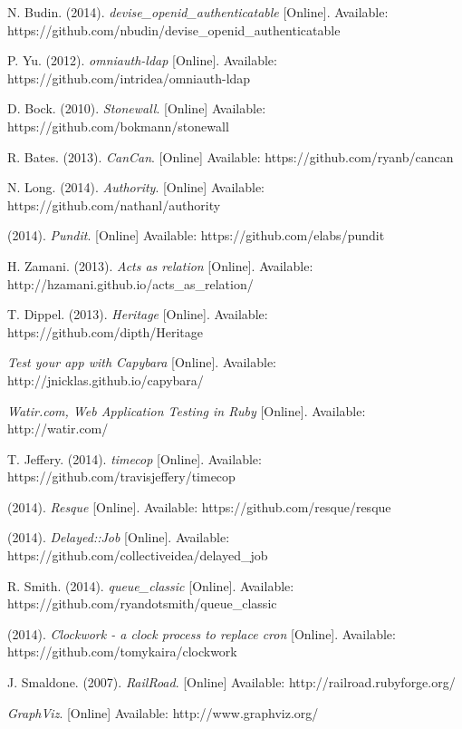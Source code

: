 \begin{thebibliography}{99}
N. Budin. (2014). \textit{devise\_openid\_authenticatable} [Online]. Available: https://github.com/nbudin/devise\_openid\_authenticatable

P. Yu. (2012). \textit{omniauth-ldap} [Online]. Available: https://github.com/intridea/omniauth-ldap

D. Bock. (2010). \textit{Stonewall}. [Online] Available: https://github.com/bokmann/stonewall

R. Bates. (2013). \textit{CanCan}. [Online] Available: https://github.com/ryanb/cancan

N. Long. (2014). \textit{Authority}. [Online] Available: https://github.com/nathanl/authority

(2014). \textit{Pundit}. [Online] Available: https://github.com/elabs/pundit

H. Zamani. (2013). \textit{Acts as relation} [Online]. Available: http://hzamani.github.io/acts\_as\_relation/

T. Dippel. (2013). \textit{Heritage} [Online]. Available: https://github.com/dipth/Heritage

\textit{Test your app with Capybara} [Online]. Available: http://jnicklas.github.io/capybara/

\textit{Watir.com, Web Application Testing in Ruby} [Online]. Available: http://watir.com/

T. Jeffery. (2014). \textit{timecop} [Online]. Available: https://github.com/travisjeffery/timecop

(2014). \textit{Resque} [Online]. Available: https://github.com/resque/resque

(2014). \textit{Delayed::Job} [Online]. Available: https://github.com/collectiveidea/delayed\_job

R. Smith. (2014). \textit{queue\_classic} [Online]. Available: https://github.com/ryandotsmith/queue\_classic

(2014). \textit{Clockwork - a clock process to replace cron} [Online]. Available: https://github.com/tomykaira/clockwork

J. Smaldone. (2007). \textit{RailRoad}. [Online] Available: http://railroad.rubyforge.org/

\textit{GraphViz}. [Online] Available: http://www.graphviz.org/


\end{thebibliography}
